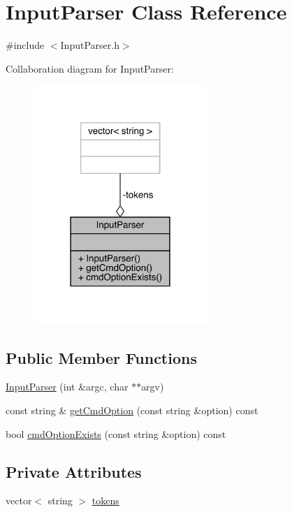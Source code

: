 \hypertarget{class_input_parser}{}\section{Input\+Parser Class Reference}
\label{class_input_parser}


{\ttfamily \#include $<$Input\+Parser.\+h$>$}



Collaboration diagram for Input\+Parser\+:
\nopagebreak
\begin{figure}[H]
\begin{center}
\leavevmode
\includegraphics[width=186pt]{class_input_parser__coll__graph}
\end{center}
\end{figure}
\subsection*{Public Member Functions}
\begin{DoxyCompactItemize}
\item 
\mbox{\hyperlink{class_input_parser_af9fa5ead1f28b5294a713410df5b9531}{Input\+Parser}} (int \&argc, char $\ast$$\ast$argv)
\item 
const string \& \mbox{\hyperlink{class_input_parser_aac05d7ad7794084907a0b57ab3e7d607}{get\+Cmd\+Option}} (const string \&option) const
\item 
bool \mbox{\hyperlink{class_input_parser_ad3d06a9c59e91f425295bdc8408e0544}{cmd\+Option\+Exists}} (const string \&option) const
\end{DoxyCompactItemize}
\subsection*{Private Attributes}
\begin{DoxyCompactItemize}
\item 
vector$<$ string $>$ \mbox{\hyperlink{class_input_parser_a4bd1105d6fc64bd0e825dc2e34515d75}{tokens}}
\end{DoxyCompactItemize}


